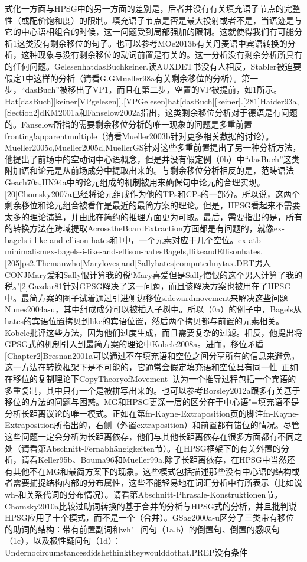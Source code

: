 式化一方面与HPSG中的另一方面的差别是，后者并没有有关填充语子节点的完整性（或配价饱和度）的限制。填充语子节点是否是最大投射或者不是，当语迹是与它的中心语相组合的时候，这一问题受到局部强加的限制。这就使得我们有可能分析1这类没有剩余移位的句子。也可以参考MOe2013b有关丹麦语中宾语转换的分析，这种现象与没有剩余移位的动词前置是有关的。这一分析没有剩余分析所具有的任何问题。GelesenhatdasBuchkeiner.读AUXDET书没有人相反，Stabler被迫要假定1中这样的分析（请看G.GMueller98a有关剩余移位的分析）。第一步，“dasBuch”被移出了VP1，而且在第二步，空置的VP被提前，如1所示。Hat[dasBuch][keiner[VPgelesen]].[VPGelesen]hat[dasBuch][keiner].[281]Haider93a,[Section2]dKM2001a和Fanselow2002a指出，这类剩余移位分析对于德语是有问题的。Fanselow所指的需要剩余移位分析的唯一现象的问题是多重前置fronting!apparentmultiple（请看Mueller2003b针对更多相关数据的讨论）。Mueller2005c,Mueller2005d,MuellerGS针对这些多重前置提出了另一种分析方法，他提出了前场中的空动词中心语概念，但是并没有假定例（0b）中“dasBuch”这类附加语和论元是从前场成分中提取出来的。与剩余移位分析相反的是，范畴语法Geach70a,HN94a中的论元组成的机制被用来确保句中论元的合理实现。[20]Chomsky2007a已经将论元组成作为他的TPs和CPs的一部分。所以说，这两个剩余移位和论元组合被看作是最近的最简方案的理论。但是，HPSG看起来不需要太多的理论演算，并由此在简约的推理方面更为可取。最后，需要指出的是，所有的转换方法在跨域提取AcrosstheBoardExtraction方面都是有问题的，就像ex-bagels-i-like-and-ellison-hates和1中，一个元素对应于几个空位。ex-atb-minimalismex-bagels-i-like-and-ellison-hatesBagels,IlikeandEllisonhates.[205]ps2.Themanwho[Maryloves]and[Sallyhates]computedmytax.DET男人CONJMary爱和Sally恨计算我的税`Mary喜爱但是Sally憎恨的这个男人计算了我的税。'[2]Gazdar81针对GPSG解决了这一问题，而且该解决方案也被用在了HPSG中。最简方案的圈子试着通过引进侧边移位sidewardmovement来解决这些问题Nunes2004a-u，其中组成成分可以被插入子树中。所以（0a）的例子中，Bagels从hates的宾语位置拷贝到like的宾语位置，然后两个拷贝都与前置的元素相关。Kobele批评这些方法，因为他们过度生成，而且需要复杂的过滤。相反，他提出将GPSG式的机制引入到最简方案的理论中Kobele2008a。进而，移位矛盾[Chapter2]Bresnan2001a可以通过不在填充语和空位之间分享所有的信息来避免，这一方法在转换框架下是不可能的，它通常会假定填充语和空位具有同一性--正如在移位的复制理论下CopyTheoryofMovement--认为一个推导过程包括一个宾语的多重复制，其中只有一个是被拼写出来的。也可以参考Borsley2012a跟多有关基于移位的方法的问题与困惑。MG和HPSG更深一层的区分在于中心语"=填充语不是分析长距离议论的唯一模式。正如在第fn-Kayne-Extraposition页的脚注fn-Kayne-Extraposition所指出的，右侧（外置extraposition）和前置都有错位的情况。尽管这些问题一定会分析为长距离依存，他们与其他长距离依存在很多方面都有不同之处（请看第Abschnitt-Fernabhängigkeiten节）。在HPSG框架下的有关外置的分析，请看Keller95b、Bouma96和Mueller99a.除了长距离依存，在HPSG中当然还有其他不在MG和最简方案下的现象。这些模式包括描述那些没有中心语的结构或者需要捕捉结构内部的分布属性，这些不能轻易地在词汇分析中有所表示（比如说wh-和关系代词的分布情况）。请看第Abschnitt-Phrasale-Konstruktionen节。Chomsky2010a比较过助词转换的基于合并的分析与HPSG式的分析，并且批判说HPSG应用了十个模式，而不是一个（合并）。GSag2000a-u区分了三类带有移位的助词的结构：带有前置副词和wh"=问句（1a,b）的倒置句、倒置的感叹句（1c），以及极性疑问句（1d）：Undernocircumstancesdidshethinktheywoulddothat.PREP没有条件